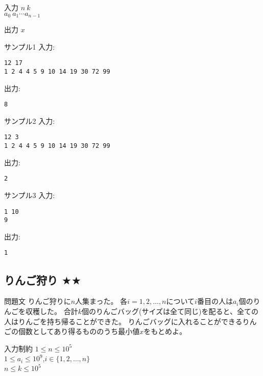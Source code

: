 \documentclass[a4paper,twoside,onecolumn,openany,article,10pt]{memoir}
\theoremstyle{remark}
\begin{document}
\begin{itembox}[l]{入力}
$n~k$\\
$a_0~a_1 \dotsb a_{n-1}$
\end{itembox}

\begin{itembox}[l]{出力}
$x$
\end{itembox}

\begin{itembox}[l]{サンプル1}
入力:
\begin{verbatim}
12 17
1 2 4 4 5 9 10 14 19 30 72 99
\end{verbatim}
出力:
\begin{verbatim}
8
\end{verbatim}
\end{itembox}

\begin{itembox}[l]{サンプル2}
入力:
\begin{verbatim}
12 3
1 2 4 4 5 9 10 14 19 30 72 99
\end{verbatim}
出力:
\begin{verbatim}
2
\end{verbatim}
\end{itembox}

\begin{itembox}[l]{サンプル3}
入力:
\begin{verbatim}
1 10
9
\end{verbatim}
出力:
\begin{verbatim}
1
\end{verbatim}
\end{itembox}

\clearpage
\subsection{りんご狩り $\bigstar\bigstar$}
\begin{itembox}[l]{問題文}
りんご狩りに$n$人集まった。
各$i=1,2,\dotsc,n$について$i$番目の人は$a_i$個のりんごを収穫した。
合計$k$個のりんごバッグ(サイズは全て同じ)を配ると、全ての人はりんごを持ち帰ることができた。
りんごバッグに入れることができるりんごの個数としてあり得るもののうち最小値$x$をもとめよ。
\end{itembox}

\begin{itembox}[l]{入力制約}
$1\le n\le 10^5$\\
$1\le a_i\le 10^9$,\hspace{2em}$i\in\{1,2,\dotsc,n\}$\\
$n\le k\le 10^5$
\end{itembox}
\end{document}

